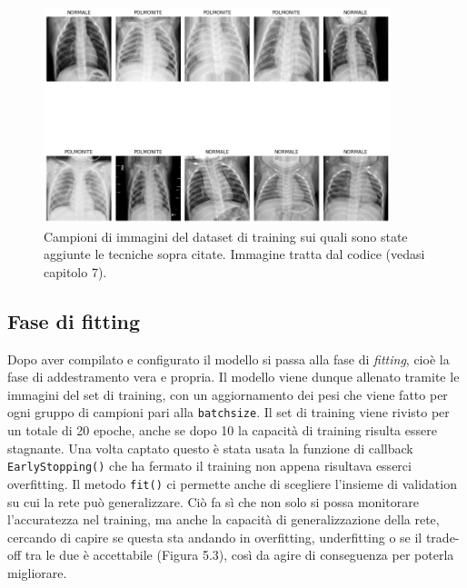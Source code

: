       
      \begin{figure}[H]
        \centering
        \includegraphics[width=0.9\textwidth]{Figures/best-augmented-images-pneumonia.png}
        \caption{\small{
        Campioni di immagini del dataset di training sui quali sono state aggiunte le tecniche sopra citate. Immagine tratta dal codice (vedasi capitolo 7).
        } %
        } %
        \label{fi:dcalc}
    \end{figure}
      
     
\subsection{Fase di fitting}
Dopo aver compilato e configurato il modello si passa alla fase di \emph{fitting}, cioè la fase di addestramento
 vera e propria. Il modello viene dunque allenato tramite le immagini del set di training, con un aggiornamento
  dei pesi che viene fatto per ogni gruppo di campioni pari alla \lstinline{batchsize}. Il set di training viene rivisto
   per un totale di 20 epoche, anche se dopo 10 la capacità di training risulta essere stagnante.
    Una volta captato questo è stata usata la funzione di callback \lstinline{EarlyStopping()} che ha fermato il
     training non appena risultava esserci overfitting. 
   Il metodo  \lstinline{fit()} ci permette anche di scegliere l’insieme di validation su cui la rete 
   può generalizzare. Ciò fa sì che non solo si possa monitorare l'accuratezza nel training, ma anche la
    capacità di generalizzazione della rete, cercando di capire se questa sta andando in overfitting, 
    underfitting o se il trade-off tra le due è accettabile (Figura 5.3), così da agire di conseguenza 
    per poterla migliorare. \\
    

